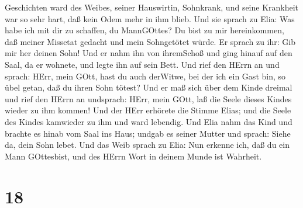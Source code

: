 Geschichten ward des Weibes, seiner Hauswirtin, Sohnkrank, und seine
Krankheit war so sehr hart, daß kein Odem mehr in ihm blieb.
 Und sie sprach zu Elia: Was habe ich mit dir zu schaffen,
du MannGOttes? Du bist zu mir hereinkommen, daß meiner Missetat gedacht
und mein Sohngetötet würde.  Er sprach zu ihr: Gib mir her
deinen Sohn! Und er nahm ihn von ihremSchoß und ging hinauf auf den
Saal, da er wohnete, und legte ihn auf sein Bett.  Und rief
den HErrn an und sprach: HErr, mein GOtt, hast du auch derWitwe, bei der
ich ein Gast bin, so übel getan, daß du ihren Sohn tötest? 
Und er maß sich über dem Kinde dreimal und rief den HErrn an undsprach:
HErr, mein GOtt, laß die Seele dieses Kindes wieder zu ihm kommen!
 Und der HErr erhörete die Stimme Elias; und die Seele des
Kindes kamwieder zu ihm und ward lebendig.  Und Elia nahm
das Kind und brachte es hinab vom Saal ins Haus; undgab es seiner Mutter
und sprach: Siehe da, dein Sohn lebet.  Und das Weib sprach
zu Elia: Nun erkenne ich, daß du ein Mann GOttesbist, und des HErrn Wort
in deinem Munde ist Wahrheit.

\hypertarget{section-17}{%
\section{18}\label{section-17}}

